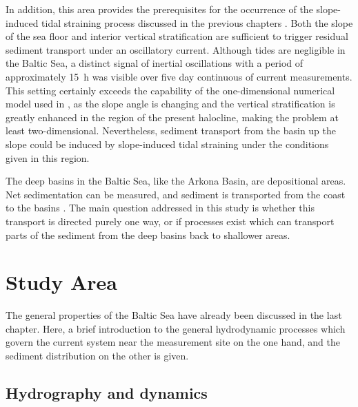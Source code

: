 In addition, this area provides the prerequisites for the occurrence of 
the slope-induced tidal straining process discussed in the previous chapters 
\citep[][]{UmlaufBurchard2011a, 
schulzumlauf2016}. Both the slope of the sea floor and 
interior vertical stratification are sufficient to trigger residual sediment 
transport under an oscillatory current. Although tides are negligible in the 
Baltic Sea, a distinct signal of inertial oscillations with a 
period of approximately 15~h was visible over five day continuous of
current measurements. This setting certainly exceeds the capability of the 
one-dimensional numerical model used in \cite{schulzumlauf2016}, as the slope 
angle is changing and the vertical stratification is greatly enhanced in the 
region of the present halocline, making the problem at least two-dimensional. 
Nevertheless, sediment transport from the basin up the slope could be induced 
by slope-induced tidal straining under the conditions given in this region.
 
 The deep basins in the Baltic Sea, like the Arkona Basin, are depositional 
areas. Net sedimentation can be measured, and sediment is transported from the 
coast to the basins \citep[][]{basys1, basys2}. The main question addressed in 
this study is whether this transport is directed purely one way, or if processes 
exist which can transport parts of the sediment from the deep basins back to 
shallower areas.

\section{Study Area}

The general properties of the Baltic Sea have already been discussed in the 
last chapter. Here, a brief introduction to the general hydrodynamic 
processes which govern the current system near the measurement site on the one 
hand, and the sediment distribution on the other is given.

\subsection{Hydrography and dynamics} 

